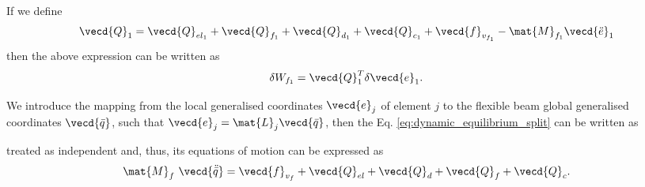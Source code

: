If we define 
\[
    \vecd{Q}_{1} = \vecd{Q}_{{el}_{1}} + \vecd{Q}_{{f}_{1}}
    + \vecd{Q}_{{d}_{1}} + \vecd{Q}_{{c}_{1}} + \vecd{f}_{v_{f_1}} -
    \mat{M}_{f_1} \vecd{\ddot{e}}_{1}
\]
then the above expression can be written as
\[
    \delta W_{f_1} = \vecd{Q}_{1}^{T} \delta \vecd{e}_{1}.
\]

We introduce the mapping from the local generalised coordinates 
$\vecd{e}_{j}$ of element $j$ to the flexible beam global generalised
coordinates $\vecd{\bar{q}}$, such that
$\vecd{e}_{j} = \mat{L}_{j} \vecd{\bar{q}}$, then
the Eq. \eqref{eq:dynamic_equilibrium_split} can be written as

treated as independent and, thus, its equations of motion can be expressed as
\begin{equation}
    \mat{M}_{f}\ \vecd{\ddot{\bar{q}}} = \vecd{f}_{v_f} + \vecd{Q}_{el} +
    \vecd{Q}_{d} + \vecd{Q}_{f} + \vecd{Q}_{c}.
    \label{eq:ddm_equations_of_motion}
\end{equation}








